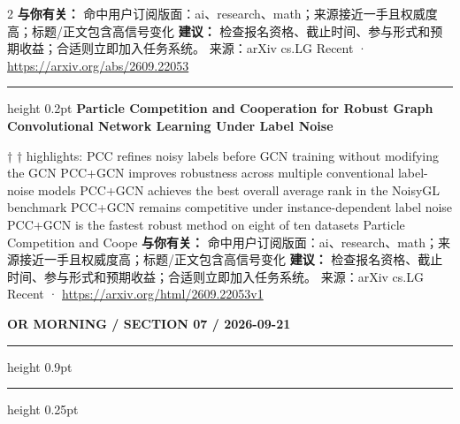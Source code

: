 \documentclass[10.5pt]{ctexart}
\begin{document}
\begin{multicols}{2}
\textbf{与你有关：} 命中用户订阅版面：ai、research、math；来源接近一手且权威度高；标题/正文包含高信号变化
\textbf{建议：} 检查报名资格、截止时间、参与形式和预期收益；合适则立即加入任务系统。
{\footnotesize\color{ormuted} 来源：arXiv cs.LG Recent · \url{https://arxiv.org/abs/2609.22053}}
\vspace{2mm}
\hrule height 0.2pt
\vspace{2mm}
{\large\bfseries Particle Competition and Cooperation for Robust Graph Convolutional Network Learning Under Label Noise}\par
[orcid=0000-0002-1123-9784] † † highlights: PCC refines noisy labels before GCN training without modifying the GCN PCC+GCN improves robustness across multiple conventional label-noise models PCC+GCN achieves the best overall average rank in the NoisyGL benchmark PCC+GCN remains competitive under instance-dependent label noise PCC+GCN is the fastest robust method on eight of ten datasets Particle Competition and Coope
\textbf{与你有关：} 命中用户订阅版面：ai、research、math；来源接近一手且权威度高；标题/正文包含高信号变化
\textbf{建议：} 检查报名资格、截止时间、参与形式和预期收益；合适则立即加入任务系统。
{\footnotesize\color{ormuted} 来源：arXiv cs.LG Recent · \url{https://arxiv.org/html/2609.22053v1}}
\end{multicols}
\newpage
{\small\bfseries OR MORNING / SECTION 07 / 2026-09-21}
\vspace{2mm}
\hrule height 0.9pt
\vspace{1.5mm}
\hrule height 0.25pt
\vspace{4mm}
\end{document}
